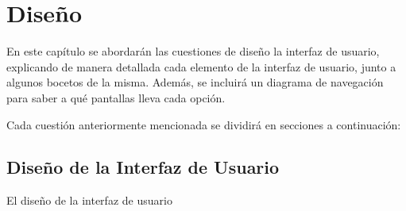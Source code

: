 \chapter{Diseño}

En este capítulo se abordarán las cuestiones de diseño la interfaz de usuario, explicando de manera detallada cada elemento de la interfaz de usuario, junto a algunos bocetos de la misma. Además, se incluirá un diagrama de navegación para saber a qué pantallas lleva cada opción.

\bigskip

Cada cuestión anteriormente mencionada se dividirá en secciones a continuación:

\section{Diseño de la Interfaz de Usuario}

El diseño de la interfaz de usuario